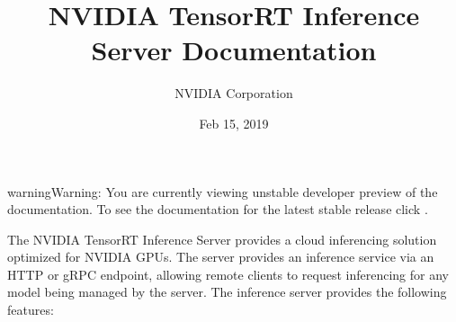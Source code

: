 \documentclass[letterpaper,10pt,english]{sphinxmanual}
\title{NVIDIA TensorRT Inference Server Documentation}
\date{Feb 15, 2019}
\author{NVIDIA Corporation}
\begin{document}
\pagestyle{empty}
\sphinxmaketitle
\pagestyle{plain}
\sphinxtableofcontents
\pagestyle{normal}
\label{\detokenize{index::doc}}


\begin{sphinxadmonition}{warning}{Warning:}
You are currently viewing unstable developer preview
of the documentation. To see the documentation for the latest
stable release click .
\end{sphinxadmonition}

The NVIDIA TensorRT Inference Server provides a cloud inferencing
solution optimized for NVIDIA GPUs. The server provides an inference
service via an HTTP or gRPC endpoint, allowing remote clients to
request inferencing for any model being managed by the server. The
inference server provides the following features:
\end{document}
